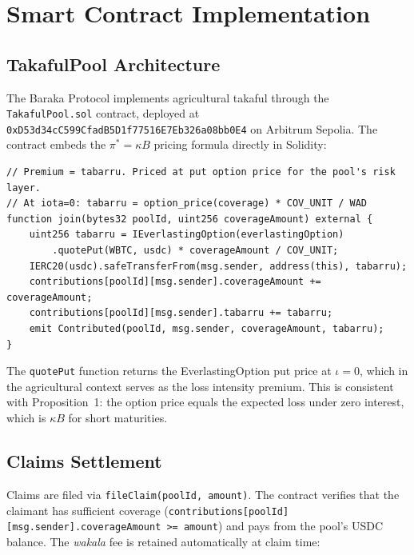 \documentclass[12pt,a4paper]{article}
\newcommand{\wakala}{\textit{wakala}}
\begin{document}
\section{Smart Contract Implementation}
\label{sec:smart_contract}

\subsection{TakafulPool Architecture}

The Baraka Protocol implements agricultural takaful through the
\texttt{TakafulPool.sol} contract, deployed at
\texttt{0xD53d34cC599CfadB5D1f77516E7Eb326a08bb0E4} on Arbitrum Sepolia.
The contract embeds the $\pi^*=\kappa B$ pricing formula directly in Solidity:

\begin{verbatim}
// Premium = tabarru. Priced at put option price for the pool's risk layer.
// At iota=0: tabarru = option_price(coverage) * COV_UNIT / WAD
function join(bytes32 poolId, uint256 coverageAmount) external {
    uint256 tabarru = IEverlastingOption(everlastingOption)
        .quotePut(WBTC, usdc) * coverageAmount / COV_UNIT;
    IERC20(usdc).safeTransferFrom(msg.sender, address(this), tabarru);
    contributions[poolId][msg.sender].coverageAmount += coverageAmount;
    contributions[poolId][msg.sender].tabarru += tabarru;
    emit Contributed(poolId, msg.sender, coverageAmount, tabarru);
}
\end{verbatim}

The \texttt{quotePut} function returns the EverlastingOption put price at $\iota=0$,
which in the agricultural context serves as the loss intensity premium.
This is consistent with Proposition~1: the option price equals the expected loss
under zero interest, which is $\kappa B$ for short maturities.

\subsection{Claims Settlement}

Claims are filed via \texttt{fileClaim(poolId, amount)}.
The contract verifies that the claimant has sufficient coverage
(\texttt{contributions[poolId][msg.sender].coverageAmount >= amount}) and pays from
the pool's USDC balance.
The \wakala{} fee is retained automatically at claim time:
\end{document}
